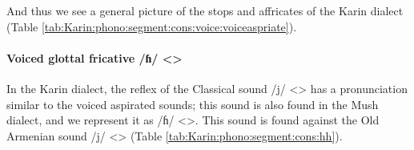 And thus we see a general picture of the stops and affricates   of the Karin dialect (Table \ref{tab:Karin:phono:segment:cons:voice:voiceaspriate}).

\begin{table}[H]
	\caption{Voiced aspirated stops and affricates in the Karin dialect}\label{tab:Karin:phono:segment:cons:voice:voiceaspriate}\centering 
{}
\end{table}

\paragraph{Voiced glottal fricative /ɦ/ <>}

In the Karin dialect, the reflex of the Classical sound /j/ <> has a pronunciation similar to the voiced aspirated sounds; this sound is also found in the Mush dialect, and we represent it as /ɦ/ <>. This sound is found against the Old Armenian sound /j/ <> (Table \ref{tab:Karin:phono:segment:cons:hh}).




